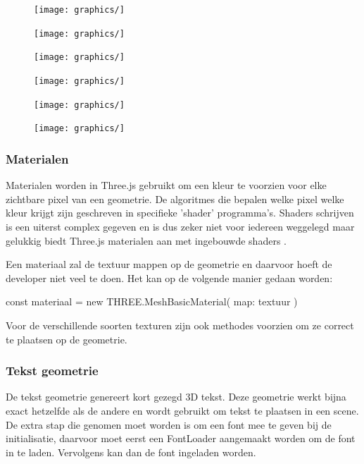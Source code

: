 \begin{figure}
	\centering
	\texttt{[image: graphics/]}
	\caption[]{}
	\label{fig:1}
\end{figure}
\begin{figure}
	\centering
	\texttt{[image: graphics/]}
	\caption[]{}
	\label{fig:2}
\end{figure}
\begin{figure}
	\centering
	\texttt{[image: graphics/]}
	\caption[]{}
	\label{fig:3}
\end{figure}
\begin{figure}
	\centering
	\texttt{[image: graphics/]}
	\caption[]{}
	\label{fig:4}
\end{figure}
\begin{figure}
	\centering
	\texttt{[image: graphics/]}
	\caption[]{}
	\label{fig:5}
\end{figure}
\begin{figure}
	\centering
	\texttt{[image: graphics/]}
	\caption[]{}
	\label{fig:6}
\end{figure}
\subsubsection{Materialen}

Materialen worden in Three.js gebruikt om een kleur te voorzien voor elke zichtbare pixel van een geometrie. De algoritmes die bepalen welke pixel welke kleur krijgt zijn geschreven in specifieke 'shader' programma's. Shaders schrijven is een uiterst complex gegeven en is dus zeker niet voor iedereen weggelegd maar gelukkig biedt Three.js materialen aan met ingebouwde shaders \autocite{Simon2023}.

Een materiaal zal de textuur mappen op de geometrie en daarvoor hoeft de developer niet veel te doen. Het kan op de volgende manier gedaan worden:

\begin{LVerbatim}
const materiaal = new THREE.MeshBasicMaterial({ map: textuur })
\end{LVerbatim}

Voor de verschillende soorten texturen zijn ook methodes voorzien om ze correct te plaatsen op de geometrie.

\subsubsection{Tekst geometrie}

De tekst geometrie genereert kort gezegd 3D tekst. Deze geometrie werkt bijna exact hetzelfde als de andere en wordt gebruikt om tekst te plaatsen in een scene. De extra stap die genomen moet worden is om een font mee te geven bij de initialisatie, daarvoor moet eerst een FontLoader aangemaakt worden om de font in te laden. Vervolgens kan dan de font ingeladen worden.

